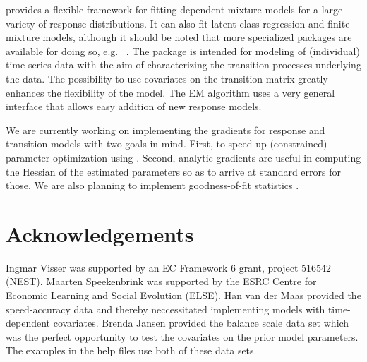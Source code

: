\documentclass[article]{jss}
\begin{document}
 provides a flexible framework for fitting dependent mixture models
for a large variety of response distributions. It can also fit latent class regression
and finite mixture models, although it should be noted that more specialized packages 
are available for doing so, e.g.\  \citep{Leisch2004}. The package is intended
for modeling of (individual) time series data with the aim of characterizing the transition 
processes underlying the data. The possibility to use covariates on the transition matrix
greatly enhances the flexibility of the model. The EM algorithm uses a very general 
interface that allows easy addition of new response models. 

We are currently working on implementing the gradients for response and transition models 
with two goals in mind. First, to speed up (constrained) parameter optimization using 
. Second, analytic gradients are useful in computing the Hessian of the
estimated parameters so as to arrive at standard errors for those. We are also planning to
implement goodness-of-fit statistics \citep{Titman2008}. 


\section*{Acknowledgements} 

Ingmar Visser was supported by an EC Framework 6 grant, project 516542
(NEST).  Maarten Speekenbrink was supported by the ESRC Centre for
Economic Learning and Social Evolution (ELSE).  Han van der Maas
provided the speed-accuracy data \cite{Dutilh2009} and thereby
neccessitated implementing models with time-dependent covariates.
Brenda Jansen provided the balance scale data set \citep{Jansen2002}
which was the perfect opportunity to test the covariates on the prior
model parameters.  The examples in the help files use both of these
data sets.


\end{document}
